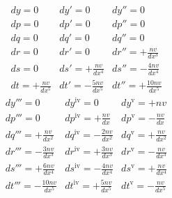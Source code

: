 \[
\renewcommand{\arraystretch}{1.5}
\begin{array}{c|c|c}
dy=0&dy'=0&dy''=0\\
dp=0&dp'=0&dp''=0\\
dq=0&dq'=0&dq''=0\\
dr=0&dr'=0&dr''=+\frac{nv}{dx^3}\\
ds=0&ds'=+\frac{nv}{dx^4}&ds''=-\frac{4nv}{dx^4}\\
dt=+\frac{nv}{dx^5}&dt'=-\frac{5nv}{dx^5}&dt''=+\frac{10nv}{dx^5}
\end{array}
\]
\[
\renewcommand{\arraystretch}{1.5}
\begin{array}{c|c|c}
dy'''=0&dy^{\mathrm{iv}}=0&dy^{\mathrm{v}}=+nv\\
dp'''=0&dp^{\mathrm{iv}}=+\frac{nv}{dx}&dp^{\mathrm{v}}=-\frac{nv}{dx}\\
dq'''=+\frac{nv}{dx^2}&dq^{\mathrm{iv}}=-\frac{2nv}{dx^2}&dq^{\mathrm{v}}=+\frac{nv}{dx^2}\\
dr'''=-\frac{3nv}{dx^3}&dr^{\mathrm{iv}}=+\frac{3nv}{dx^3}&dr^{\mathrm{v}}=-\frac{nv}{dx^3}\\
ds'''=+\frac{6nv}{dx^4}&ds^{\mathrm{iv}}=-\frac{4nv}{dx^4}&ds^{\mathrm{v}}=+\frac{nv}{dx^4}\\
dt'''=-\frac{10nv}{dx^5}&dt^{\mathrm{iv}}=+\frac{5nv}{dx^5}&dt^{\mathrm{v}}=-\frac{nv}{dx^5}
\end{array}
\]

